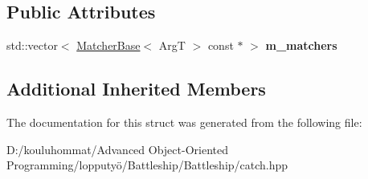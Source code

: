 \subsection*{Public Attributes}
\begin{DoxyCompactItemize}
\item 
\mbox{\label{struct_catch_1_1_matchers_1_1_impl_1_1_match_any_of_a1fb1119e6110dc15b8d5262ec0aeddd5}} 
std\+::vector$<$ \mbox{\hyperlink{struct_catch_1_1_matchers_1_1_impl_1_1_matcher_base}{Matcher\+Base}}$<$ ArgT $>$ const  $\ast$ $>$ {\bfseries m\+\_\+matchers}
\end{DoxyCompactItemize}
\subsection*{Additional Inherited Members}


The documentation for this struct was generated from the following file\+:\begin{DoxyCompactItemize}
\item 
D\+:/kouluhommat/\+Advanced Object-\/\+Oriented Programming/lopputyö/\+Battleship/\+Battleship/catch.\+hpp\end{DoxyCompactItemize}
